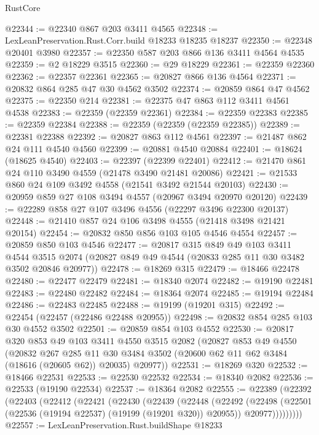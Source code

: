 \begin{lexlean}{RustCore}
\begin{coremodule}
@22344 := @22340 @867 @203 @3411 @4565
@22348 := LexLeanPreservation.Rust.Corr.build @18233 @18235 @18237
@22350 := @22348 @20401 @3980
@22357 := @22350 @587 @203 @866 @136 @3411 @4564 @4535
@22359 := @2 @18229 @3515
@22360 := @29 @18229
@22361 := @22359 @22360
@22362 := @22357 @22361
@22365 := @20827 @866 @136 @4564
@22371 := @20832 @864 @285 @47 @30 @4562 @3502
@22374 := @20859 @864 @47 @4562
@22375 := @22350 @214
@22381 := @22375 @47 @863 @112 @3411 @4561 @4538
@22383 := @22359 (@22359 @22361)
@22384 := @22359 @22383
@22385 := @22359 @22384
@22388 := @22359 (@22359 (@22359 @22385))
@22389 := @22381 @22388
@22392 := @20827 @863 @112 @4561
@22397 := @21487 @862 @24 @111 @4540 @4560
@22399 := @20881 @4540 @20884
@22401 := @18624 (@18625 @4540)
@22403 := @22397 (@22399 @22401)
@22412 := @21470 @861 @24 @110 @3490 @4559 (@21478 @3490 @21481 @20086)
@22421 := @21533 @860 @24 @109 @3492 @4558 (@21541 @3492 @21544 @20103)
@22430 := @20959 @859 @27 @108 @3494 @4557 (@20967 @3494 @20970 @20120)
@22439 := @22289 @858 @27 @107 @3496 @4556 (@22297 @3496 @22300 @20137)
@22448 := @21410 @857 @24 @106 @3498 @4555 (@21418 @3498 @21421 @20154)
@22454 := @20832 @850 @856 @103 @105 @4546 @4554
@22457 := @20859 @850 @103 @4546
@22477 := @20817
    @315
    @849
    @49
    @103
    @3411
    @4544
    @3515
    @2074
    (@20827 @849 @49 @4544 (@20833 @285 @11 @30 @3482 @3502 @20846 @20977))
@22478 := @18269 @315
@22479 := @18466 @22478
@22480 := @22477 @22479
@22481 := @18340 @2074
@22482 := @19190 @22481
@22483 := @22480 @22482
@22484 := @18364 @2074
@22485 := @19194 @22484
@22486 := @22483 @22485
@22488 := @19199 (@19201 @315)
@22492 := @22454 (@22457 (@22486 @22488 @20955))
@22498 := @20832 @854 @285 @103 @30 @4552 @3502
@22501 := @20859 @854 @103 @4552
@22530 := @20817
    @320
    @853
    @49
    @103
    @3411
    @4550
    @3515
    @2082
    (@20827
      @853
      @49
      @4550
      (@20832
        @267
        @285
        @11
        @30
        @3484
        @3502
        (@20600 @62 @11 @62 @3484 (@18616 (@20605 @62)) @20035)
        @20977))
@22531 := @18269 @320
@22532 := @18466 @22531
@22533 := @22530 @22532
@22534 := @18340 @2082
@22536 := @22533 (@19190 @22534)
@22537 := @18364 @2082
@22555 := @22389
    (@22392
      (@22403
        (@22412
          (@22421
            (@22430
              (@22439
                (@22448
                  (@22492
                    (@22498
                      (@22501 (@22536 (@19194 @22537) (@19199 (@19201 @320)) @20955))
                      @20977)))))))))
@22557 := LexLeanPreservation.Rust.buildShape @18233

\end{coremodule}
\end{lexlean}
